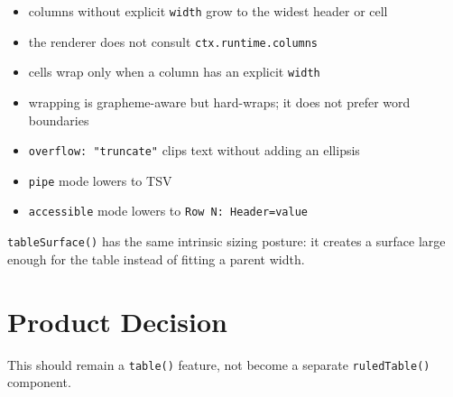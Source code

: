 \begin{itemize}
\tightlist
\item
  columns without explicit \texttt{w\allowbreak{}i\allowbreak{}d\allowbreak{}t\allowbreak{}h} grow to the widest header or cell
\item
  the renderer does not consult \texttt{c\allowbreak{}t\allowbreak{}x\allowbreak{}.\allowbreak{}r\allowbreak{}u\allowbreak{}n\allowbreak{}t\allowbreak{}i\allowbreak{}m\allowbreak{}e\allowbreak{}.\allowbreak{}c\allowbreak{}o\allowbreak{}l\allowbreak{}u\allowbreak{}m\allowbreak{}n\allowbreak{}s}
\item
  cells wrap only when a column has an explicit \texttt{w\allowbreak{}i\allowbreak{}d\allowbreak{}t\allowbreak{}h}
\item
  wrapping is grapheme-aware but hard-wraps; it does not prefer word boundaries
\item
  \texttt{o\allowbreak{}v\allowbreak{}e\allowbreak{}r\allowbreak{}f\allowbreak{}l\allowbreak{}o\allowbreak{}w\allowbreak{}:\allowbreak{} \allowbreak{}"\allowbreak{}t\allowbreak{}r\allowbreak{}u\allowbreak{}n\allowbreak{}c\allowbreak{}a\allowbreak{}t\allowbreak{}e\allowbreak{}"} clips text without adding an ellipsis
\item
  \texttt{p\allowbreak{}i\allowbreak{}p\allowbreak{}e} mode lowers to TSV
\item
  \texttt{a\allowbreak{}c\allowbreak{}c\allowbreak{}e\allowbreak{}s\allowbreak{}s\allowbreak{}i\allowbreak{}b\allowbreak{}l\allowbreak{}e} mode lowers to \texttt{R\allowbreak{}o\allowbreak{}w\allowbreak{} \allowbreak{}N\allowbreak{}:\allowbreak{} \allowbreak{}H\allowbreak{}e\allowbreak{}a\allowbreak{}d\allowbreak{}e\allowbreak{}r\allowbreak{}=\allowbreak{}v\allowbreak{}a\allowbreak{}l\allowbreak{}u\allowbreak{}e}
\end{itemize}

\texttt{t\allowbreak{}a\allowbreak{}b\allowbreak{}l\allowbreak{}e\allowbreak{}S\allowbreak{}u\allowbreak{}r\allowbreak{}f\allowbreak{}a\allowbreak{}c\allowbreak{}e\allowbreak{}(\allowbreak{})} has the same intrinsic sizing posture: it creates a surface large enough for the table instead of fitting a parent width.

\section{Product Decision}\label{record-133-product-decision}

This should remain a \texttt{t\allowbreak{}a\allowbreak{}b\allowbreak{}l\allowbreak{}e\allowbreak{}(\allowbreak{})} feature, not become a separate \texttt{r\allowbreak{}u\allowbreak{}l\allowbreak{}e\allowbreak{}d\allowbreak{}T\allowbreak{}a\allowbreak{}b\allowbreak{}l\allowbreak{}e\allowbreak{}(\allowbreak{})} component.

